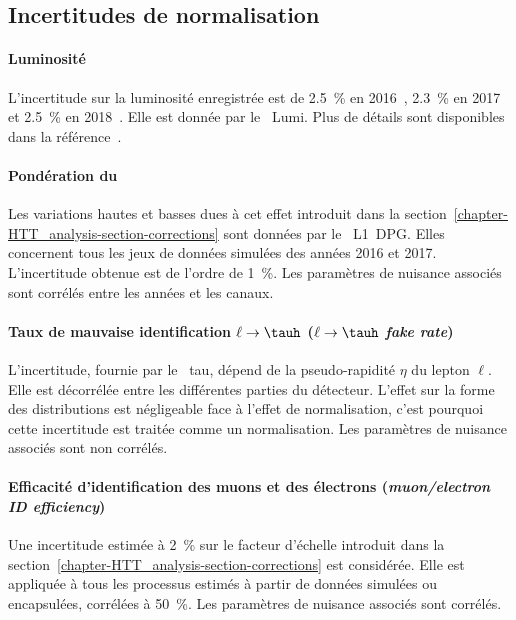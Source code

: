 \subsection{Incertitudes de normalisation}\label{chapter-HTT_analysis-section-systematics-normalization}
\paragraph{Luminosité}
L'incertitude sur la luminosité enregistrée est de
\SI{2.5}{\%} en 2016~\cite{CMS-PAS-LUM-17-001},
\SI{2.3}{\%} en 2017~\cite{CMS-PAS-LUM-17-004} et
\SI{2.5}{\%} en 2018~\cite{CMS-PAS-LUM-18-002}.
Elle est donnée par le \POG\ Lumi.
Plus de détails sont disponibles dans la référence~\cite{LumiTwiki}.
\paragraph{Pondération du \prefiring}
Les variations hautes et basses dues à cet effet introduit dans la section~\ref{chapter-HTT_analysis-section-corrections} sont données par le \POG\ L1~DPG.
Elles concernent tous les jeux de données simulées des années 2016 et 2017.
L'incertitude obtenue est de l'ordre de \SI{1}{\%}.
Les paramètres de nuisance associés sont corrélés entre les années et les canaux.
\paragraph{Taux de mauvaise identification $\ell\to\tauh$ (\emph{$\ell\to\tauh$ fake rate})}
L'incertitude, fournie par le \POG\ tau, dépend de la pseudo-rapidité $\eta$ du lepton $\ell$.
Elle est décorrélée entre les différentes parties du détecteur.
L'effet sur la forme des distributions est négligeable face à l'effet de normalisation, c'est pourquoi cette incertitude est traitée comme un normalisation.
Les paramètres de nuisance associés sont non corrélés.
\paragraph{Efficacité d'identification des muons et des électrons (\emph{muon/electron ID efficiency})}
Une incertitude estimée à \SI{2}{\%} sur le facteur d'échelle introduit dans la section~\ref{chapter-HTT_analysis-section-corrections} est considérée.
Elle est appliquée à tous les processus estimés à partir de données simulées ou encapsulées, corrélées à \SI{50}{\%}.
Les paramètres de nuisance associés sont corrélés.
